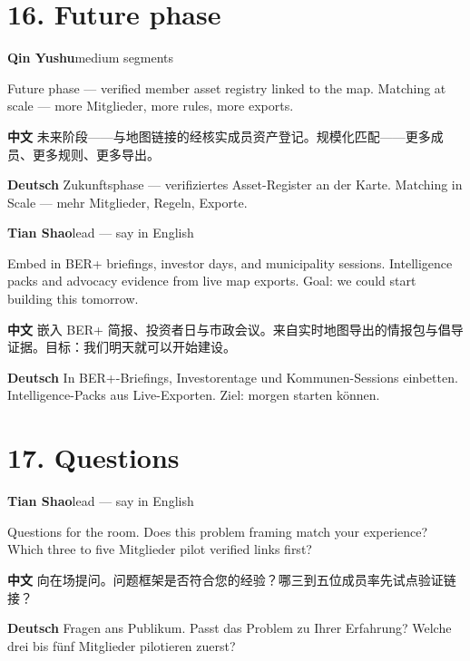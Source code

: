 \documentclass[11pt,a4paper]{ctexart}
\newenvironment{speakerblock}[2]{%
  \par\medskip
  {\color{berblue}\textbf{#1}}\hfill{\small\textcolor{bergrey}{#2}}\par
  \vspace{0.25em}
}{\par\medskip}
\begin{document}
\section{16. Future phase}

\begin{speakerblock}{Qin Yushu}{medium segments}
\begin{englishbox}
Future phase — verified member asset registry linked to the map. Matching at scale — more Mitglieder, more rules, more exports.
\end{englishbox}

\textbf{中文} 未来阶段——与地图链接的经核实成员资产登记。规模化匹配——更多成员、更多规则、更多导出。

\textbf{Deutsch} Zukunftsphase — verifiziertes Asset-Register an der Karte. Matching in Scale — mehr Mitglieder, Regeln, Exporte.
\end{speakerblock}


\begin{speakerblock}{Tian Shao}{lead — say in English}
\begin{englishbox}
Embed in BER+ briefings, investor days, and municipality sessions. Intelligence packs and advocacy evidence from live map exports. Goal: we could start building this tomorrow.
\end{englishbox}

\textbf{中文} 嵌入 BER+ 简报、投资者日与市政会议。来自实时地图导出的情报包与倡导证据。目标：我们明天就可以开始建设。

\textbf{Deutsch} In BER+-Briefings, Investorentage und Kommunen-Sessions einbetten. Intelligence-Packs aus Live-Exporten. Ziel: morgen starten können.
\end{speakerblock}



\section{17. Questions}

\begin{speakerblock}{Tian Shao}{lead — say in English}
\begin{englishbox}
Questions for the room. Does this problem framing match your experience? Which three to five Mitglieder pilot verified links first?
\end{englishbox}

\textbf{中文} 向在场提问。问题框架是否符合您的经验？哪三到五位成员率先试点验证链接？

\textbf{Deutsch} Fragen ans Publikum. Passt das Problem zu Ihrer Erfahrung? Welche drei bis fünf Mitglieder pilotieren zuerst?
\end{speakerblock}
\end{document}
